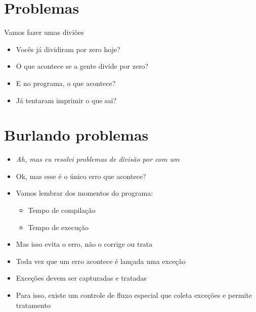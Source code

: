 \documentclass[14pt]{beamer}
\subtitle{Todos, exceto alguns}
\begin{document}
	
	\begin{frame}
		\titlepage
	\end{frame}

	\begin{frame}
		\tableofcontents
	\end{frame}

	\section{Problemas}
		\begin{frame}{Vamos fazer umas diviões}
			\begin{itemize}
				\presentationPause\item Vocês já dividiram por zero hoje?
				\presentationPause\item O que acontece se a gente divide por zero?
				\presentationPause\item E no programa, o que acontece?
				\presentationPause\item Já tentaram imprimir o que sai?
			\end{itemize}
			\presentationPause
		\end{frame}

	\section{Burlando problemas}
		\begin{frame}
			\begin{itemize}
				\presentationPause\item \textit{Ah, mas eu resolvi problemas de divisão por  com um \basicCode{if}}
				\presentationPause\item Ok, mas esse é o único erro que acontece?
				\presentationPause\item Vamos lembrar dos momentos do programa:
					\begin{itemize}
						\presentationPause\item Tempo de compilação
						\presentationPause\item Tempo de execução
					\end{itemize}
				\presentationPause\item Mas isso evita o erro, não o corrige ou trata
				\presentationPause\item Toda vez que um erro acontece é lançada uma exceção
				\presentationPause\item Exceções devem ser capturadas e tratadas
				\presentationPause\item Para isso, existe um controle de fluxo especial que coleta exceções e permite tratamento
			\end{itemize}
		\end{frame}
\end{document}
